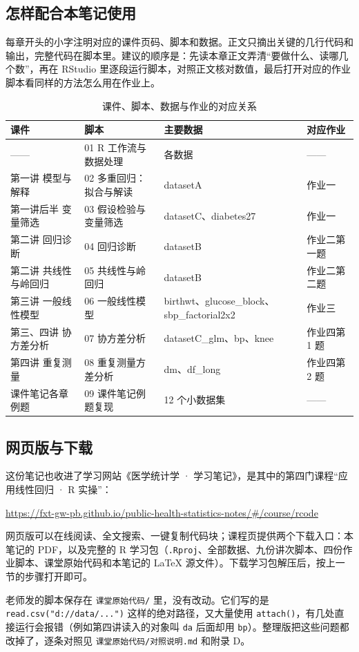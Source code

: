 \subsection{怎样配合本笔记使用}
每章开头的小字注明对应的课件页码、脚本和数据。正文只摘出关键的几行代码和输出，完整代码在脚本里。建议的顺序是：先读本章正文弄清“要做什么、读哪几个数”，再在 RStudio 里逐段运行脚本，对照正文核对数值，最后打开对应的作业脚本看同样的方法怎么用在作业上。

\begin{table}[htbp]
\centering\small
\caption{课件、脚本、数据与作业的对应关系}
\label{tab:map}
\begin{tabular}{@{}p{3.3cm}p{4.2cm}p{4.3cm}p{2.0cm}@{}}
\toprule
课件 & 脚本 & 主要数据 & 对应作业\\
\midrule
—— & 01 R 工作流与数据处理 & 各数据 & ——\\
第一讲 模型与解释 & 02 多重回归：拟合与解读 & datasetA & 作业一\\
第一讲后半 变量筛选 & 03 假设检验与变量筛选 & datasetC、diabetes27 & 作业一\\
第二讲 回归诊断 & 04 回归诊断 & datasetB & 作业二第一题\\
第二讲 共线性与岭回归 & 05 共线性与岭回归 & datasetB & 作业二第二题\\
第三讲 一般线性模型 & 06 一般线性模型 & birthwt、glucose\_block、sbp\_factorial2x2 & 作业三\\
第三、四讲 协方差分析 & 07 协方差分析 & datasetC\_glm、bp、knee & 作业四第 1 题\\
第四讲 重复测量 & 08 重复测量方差分析 & dm、df\_long & 作业四第 2 题\\
课件笔记各章例题 & 09 课件笔记例题复现 & 12 个小数据集 & ——\\
\bottomrule
\end{tabular}
\end{table}

\subsection{网页版与下载}
这份笔记也收进了学习网站《医学统计学 · 学习笔记》，是其中的第四门课程“应用线性回归 · R 实操”：

\begin{center}
\url{https://fxt-gw-pb.github.io/public-health-statistics-notes/#/course/rcode}
\end{center}

网页版可以在线阅读、全文搜索、一键复制代码块；课程页提供两个下载入口：本笔记的 PDF，以及完整的 R 学习包（\Verb|.Rproj|、全部数据、九份讲次脚本、四份作业脚本、课堂原始代码和本笔记的 LaTeX 源文件）。下载学习包解压后，按上一节的步骤打开即可。

\begin{notebox}[关于课堂原始代码]
老师发的脚本保存在 \Verb|课堂原始代码/| 里，没有改动。它们写的是 \Verb|read.csv("d://data/...")| 这样的绝对路径，又大量使用 \Verb|attach()|，有几处直接运行会报错（例如第四讲读入的对象叫 \Verb|da| 后面却用 \Verb|bp|）。整理版把这些问题都改掉了，逐条对照见 \Verb|课堂原始代码/对照说明.md| 和附录 D。
\end{notebox}
